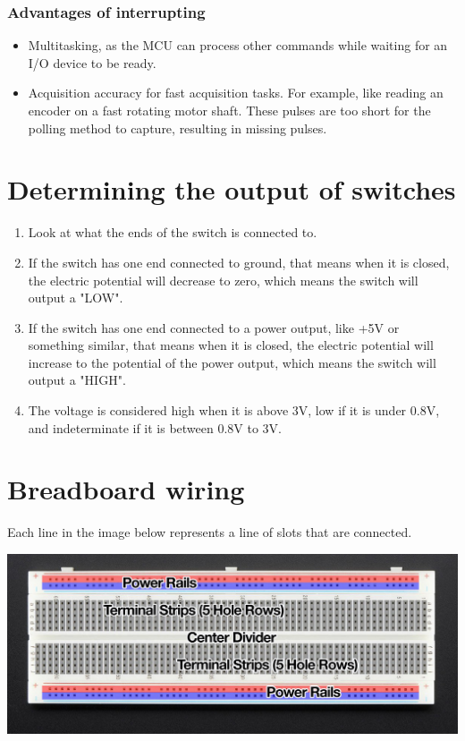 \documentclass[11pt]{article}
\begin{document}
\subsubsection{Advantages of interrupting}
\label{sec:orgf688f3d}
\begin{itemize}
\item Multitasking, as the MCU can process other commands while waiting for an I/O device to be ready.
\item Acquisition accuracy for fast acquisition tasks. For example, like reading an encoder on a fast rotating motor shaft. These pulses are too short for the polling method to capture, resulting in missing pulses.
\end{itemize}
\section{Determining the output of switches}
\label{sec:org6354426}
\begin{enumerate}
\item Look at what the ends of the switch is connected to.
\item If the switch has one end connected to ground, that means when it is closed, the electric potential will decrease to zero, which means the switch will output a "LOW".
\item If the switch has one end connected to a power output, like +5V or something similar, that means when it is closed, the electric potential will increase to the potential of the power output, which means the switch will output a "HIGH".
\item The voltage is considered high when it is above 3V, low if it is under 0.8V, and indeterminate if it is between 0.8V to 3V.
\end{enumerate}
\section{Breadboard wiring}
\label{sec:orgad9c525}
Each line in the image below represents a line of slots that are connected.
\begin{center}
\includegraphics[width=.9\linewidth]{./images/breadboard-wiring.jpg}
\end{center}
\end{document}
